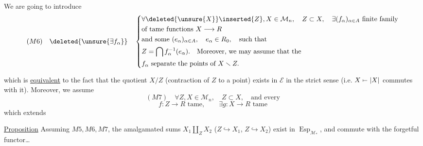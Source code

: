 We are going to introduce
\[
(M6)\quad\deleted{\unsure{\exists f_\alpha}}\quad
\left\{\begin{aligned}
&\forall \deleted{\unsure{X}}\inserted{Z},X\in\mathcal M_n,\quad Z\subset X,\quad\exists(f_\alpha)_{\alpha\in A}\ \text{finite family}\\
&\text{of tame functions }X\longrightarrow R\\
&\text{and some }(e_\alpha)_{\alpha\in A},\quad e_\alpha\in R_0,\quad\text{such that}\\
&Z=\bigcap f_\alpha^{-1}(e_\alpha).\quad\text{Moreover, we may assume that the}\\
&f_\alpha\text{ separate the points of }X\smallsetminus Z.
\end{aligned}\right.
\]




which is \uline{equivalent} to the fact that the quotient $X/Z$ (contraction of $Z$ to a point) exists in $\mathcal E$ in the strict sense (i.e. $X\mathrel{\mapstochar\relbar}|X|$ commutes with it). Moreover, we assume
\[
(M7)\quad\forall Z,X\in\mathcal M_n,\quad Z\subset X,\quad\text{and every}
\]
\[
f:Z\longrightarrow R\text{ tame},\qquad\exists g:X\longrightarrow R\text{ tame}
\]
which extends 

\uline{Proposition} Assuming $M5,M6,M7$, the amalgamated sums $X_1\amalg_Z X_2$ ($Z\hookrightarrow X_1$, $Z\hookrightarrow X_2$) exist in $\operatorname{Esp}_{\mathcal M_*}$, and commute with the forgetful functor\ldots
{}
